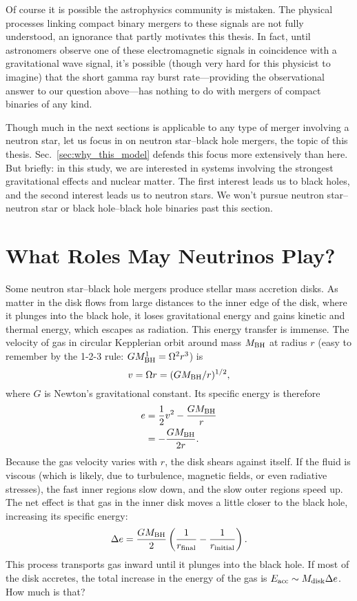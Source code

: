 Of course it is possible the astrophysics community is mistaken.
The physical processes linking compact binary mergers to these
signals are not fully understood, an ignorance that partly motivates this thesis.
In fact, until astronomers observe one of these electromagnetic signals in
coincidence with a gravitational wave signal, it's possible (though very hard
for this physicist to imagine) that the short
gamma ray burst rate---providing the observational answer to our question
above---has nothing to do with mergers of compact binaries of any kind.

Though much in the next sections is applicable to any type of merger involving
a neutron star, let us focus in on neutron star--black hole \nsbh
mergers, the topic of this thesis. Sec.~\ref{sec:why_this_model} defends this
focus more extensively than here.
But briefly: in this study, we are interested in systems involving the
strongest gravitational effects and nuclear matter. The first interest leads us
to black holes, and the second interest leads us to neutron stars.
We won't pursue neutron star--neutron star
\nsns or black hole--black hole \bhbh binaries past this section.

\section{What Roles May Neutrinos Play?}
\label{sec:neutrino_roles}
Some neutron star--black hole mergers produce stellar mass accretion disks.
As matter in the disk flows from large distances to the
inner edge of the disk, where it plunges into the black hole, it loses
gravitational energy and gains kinetic and thermal energy, which escapes
as radiation. This energy transfer is immense. The velocity of gas in circular
Kepplerian orbit around mass $M_{\rm BH}$ at radius $r$
(easy to remember by the 1-2-3 rule: $GM_{\rm BH}^1=\Omega^2r^3$) is
\begin{equation}
  v = \Omega r  = (GM_{\rm BH}/r)^{1/2}, \nonumber
\end{equation}
where $G$ is Newton's gravitational constant.
Its specific energy is therefore
\begin{align}
  e &= \frac{1}{2}v^2-\frac{GM_{\rm BH}}{r} \nonumber \\
  &= -\frac{GM_{\rm BH}}{2r}. \nonumber
\end{align}
Because the gas velocity varies with $r$, the disk shears against itself. If the
fluid is viscous (which is likely, due to turbulence, magnetic fields, or even
radiative stresses),
the fast inner regions slow down, and the slow outer regions speed up. The net
effect is that gas in the inner disk moves a little closer to the black hole,
increasing its specific energy:
\begin{equation}
  \Delta e = \frac{GM_{\rm BH}}{2}
  \left(\frac{1}{r_{\rm final}}-\frac{1}{r_{\rm initial}}\right). \nonumber
\end{equation}
This process transports gas inward until it plunges into the black hole.
If most of the disk accretes, the total increase in the energy of the gas
is $E_{\rm acc}\sim M_{\rm disk} \Delta e$. How much is that?

